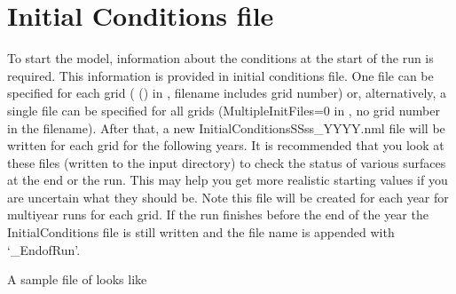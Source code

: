 \documentclass[letterpaper,10pt,english]{sphinxmanual}
\begin{document}
\section{Initial Conditions file}
\label{\detokenize{input_files/Initial_Conditions/Initial_Conditions::doc}}\label{\detokenize{input_files/Initial_Conditions/Initial_Conditions:initial-conditions}}\label{\detokenize{input_files/Initial_Conditions/Initial_Conditions:initial-conditions-file}}
To start the model, information about the conditions at the start of the
run is required. This information is provided in initial conditions
file. One file can be specified for each grid
({\hyperref[\detokenize{input_files/RunControl/File_related_options:cmdoption-arg-multipleinitfiles}]{}} () in
, filename includes grid number) or,
alternatively, a single file can be specified for all grids
(MultipleInitFiles=0 in , no grid
number in the filename). After that, a new
InitialConditionsSSss\_YYYY.nml file will be written for each grid for
the following years. It is recommended that you look at these files
(written to the input directory) to check the status of various surfaces
at the end or the run. This may help you get more realistic starting
values if you are uncertain what they should be. Note this file will be
created for each year for multiyear runs for each grid. If the run
finishes before the end of the year the InitialConditions file is still
written and the file name is appended with ‘\_EndofRun’.

A sample file of  looks like

%
\begin{sphinxVerbatim}[commandchars=\\\{\}]
\end{sphinxVerbatim}
\end{document}
